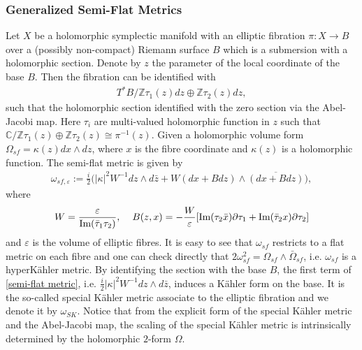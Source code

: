 \documentclass[11pt]{amsart}
\theoremstyle{plain}
\theoremstyle{definition}
\numberwithin{equation}{section}
\renewcommand{\epsilon}{\varepsilon}
\begin{document}
\subsubsection{Generalized Semi-Flat Metrics}\label{sec: generalized sf metric}
Let $X$ be a holomorphic symplectic manifold with an elliptic fibration $\pi: X\rightarrow B$ over a (possibly non-compact) Riemann surface $B$ which is a submersion with a holomorphic section. Denote by $z$ the parameter of the local coordinate of the base $B$. Then the fibration can be identified with 
  \begin{align*}
  	  T^*B/\mathbb{Z}\tau_1(z)dz\oplus \mathbb{Z}\tau_2(z)dz,
  \end{align*} such that the holomorphic section identified with the zero section via the Abel-Jacobi map. Here $\tau_i$ are multi-valued holomorphic function in $z$ such that $\mathbb{C}/\mathbb{Z}\tau_1(z)\oplus \mathbb{Z}\tau_2(z)\cong \pi^{-1}(z)$. Given a holomorphic volume form $\Omega_{sf}=\kappa(z)dx\wedge dz$, where $x$ is the fibre coordinate and $\kappa(z)$ is a holomorphic function. The semi-flat metric is given by 
 \begin{align} \label{semi-flat metric}
 	  \omega_{sf,\epsilon}:=\frac{i}{2}\big(|\kappa|^2W^{-1}dz\wedge d\bar{z}+W(dx+Bdz)\wedge \overline{(dx+Bdz)}\big), 
 \end{align} where 
  \begin{align} \label{special Kahler}
  	W= \frac{\epsilon}{\mbox{Im}(\bar{\tau}_1\tau_2)} , \hspace{4mm}
  	B(z,x)= -\frac{W}{\epsilon}[\mbox{Im}(\tau_2\bar{x})\partial\tau_1+\mbox{Im}(\bar{\tau}_2x)\partial \tau_2] 
  \end{align} and $\epsilon$ is the volume of elliptic fibres. It is easy to see that ${\omega}_{sf}$ restricts to a flat metric on each fibre and one can check directly that $2{\omega}_{sf}^2={\Omega}_{sf}\wedge \bar{{\Omega}}_{sf}$, i.e. ${\omega}_{sf}$ is a hyperK\"ahler metric. By identifying the section with the base $B$, the first term of \eqref{semi-flat metric}, i.e.  $\frac{i}{2}|\kappa|^2W^{-1}dz\wedge d\bar{z}$, induces a K\"ahler form on the base. It is the so-called special K\"ahler metric associate to the elliptic fibration and we denote it by $\omega_{SK}$. Notice that from the explicit form of the special K\"ahler metric and the Abel-Jacobi map, the scaling of the special K\"ahler metric is intrinsically determined by the holomorphic $2$-form $\Omega$. 
\end{document}
